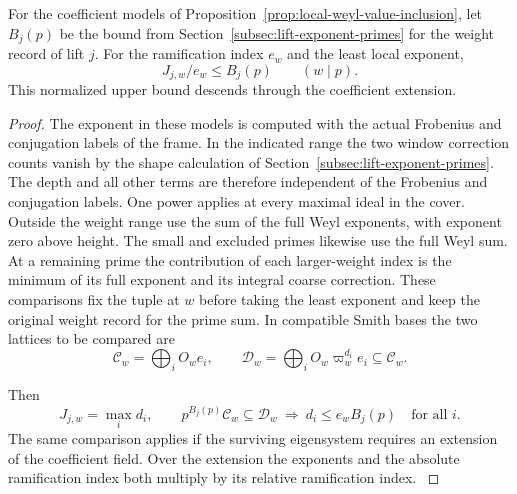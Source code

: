 


\begin{lemma}
\label{lem:weyl-least-exponent-local}
For the coefficient models of Proposition~\ref{prop:local-weyl-value-inclusion},
let \(B_j(p)\) be the bound from Section~\ref{subsec:lift-exponent-primes}
for the weight record of lift \(j\). For the ramification index \(e_w\) and the least local exponent,
\[
 J_{j,w}/e_w\le B_j(p)\qquad(w\mid p).
\]
This normalized upper bound descends through the coefficient extension.
\end{lemma}

\begin{proof}
The exponent in these models is computed with the actual
Frobenius and conjugation labels of the frame. In the indicated
range the two window correction counts vanish by the shape
calculation of Section~\ref{subsec:lift-exponent-primes}.
The depth and all other terms are therefore independent of the Frobenius and conjugation labels. One power applies at every maximal ideal in the cover. Outside the weight range use the sum of the full Weyl exponents, with exponent zero above height. The small and excluded primes likewise use the full Weyl sum. At a remaining prime the contribution of each larger-weight index is the minimum of its full exponent and its integral coarse correction. These comparisons fix the
tuple at \(w\) before taking the least exponent and keep the
original weight record for the prime sum. In compatible Smith bases the two lattices to be compared are
\[
 \mathcal C_w=\bigoplus_i O_we_i,\qquad \mathcal D_w=\bigoplus_i O_w\varpi_w^{d_i}e_i\subseteq\mathcal C_w.
\]

Then
\[
     J_{j,w}=\max_i d_i,\qquad
     p^{B_j(p)}\mathcal C_w\subseteq\mathcal D_w
             \ \Longrightarrow\ d_i\le e_wB_j(p)\quad\text{for all }i.
\]
The same comparison applies if the surviving eigensystem
requires an extension of the coefficient field. Over the extension the exponents and
the absolute ramification index both multiply by its relative
ramification index.
\label{cor:lift-exponent-models-3}
\end{proof}

